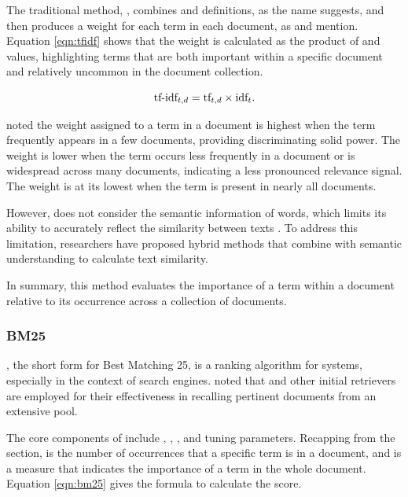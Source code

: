 The traditional {\ir} method, {\tfidf}, combines {\tf} and {\idf} definitions, as the name suggests, and then produces a weight for each term in each document, as \citet{manning_introduction_2009} and \cite{lan_research_2022} mention. Equation \ref{eqn:tfidf} shows that the weight is calculated as the product of {\tf} and {\idf} values, highlighting terms that are both important within a specific document and relatively uncommon in the document collection.

\begin{equation}
\textup{tf-idf}_{t,d} = \textup{tf}_{t,d} \times \textup{idf}_{t}.
\label{eqn:tfidf}
\end{equation}

\citet{manning_introduction_2009} noted the {\tfidf} weight assigned to a term in a document is highest when the term frequently appears in a few documents, providing discriminating solid power. The weight is lower when the term occurs less frequently in a document or is widespread across many documents, indicating a less pronounced relevance signal. The weight is at its lowest when the term is present in nearly all documents. 

However, {\tfidf} does not consider the semantic information of words, which limits its ability to accurately reflect the similarity between texts \cite{lan_research_2022}. To address this limitation, researchers have proposed hybrid methods that combine {\tfidf} with semantic understanding to calculate text similarity.

In summary, this {\ir} method evaluates the importance of a term within a document relative to its occurrence across a collection of documents.


\subsubsection{BM25}

{\bm}, the short form for Best Matching 25, is a ranking algorithm for {\ir} systems, especially in the context of search engines. \citet{hambarde_information_2023} noted that {\bm} and other initial retrievers are employed for their effectiveness in recalling pertinent documents from an extensive pool.

The core components of {\bm} include {\tf}, {\idf}, {\dl}, and tuning parameters. Recapping from the {\tfidf} section, {\tf} is the number of occurrences that a specific term is in a document, and {\idf} is a measure that indicates the importance of a term in the whole document. Equation \ref{eqn:bm25} gives the formula to calculate the {\bm} score.

